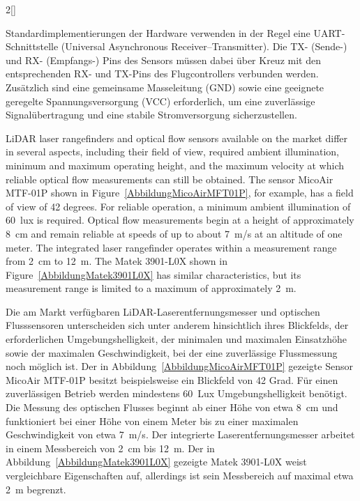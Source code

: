 \begin{paracol}{2}[]
\colger

Standardimplementierungen der Hardware verwenden in der Regel eine UART-Schnittstelle (Universal Asynchronous Receiver–Transmitter). Die TX- (Sende-) und RX- (Empfangs-) Pins des Sensors müssen dabei über Kreuz mit den entsprechenden RX- und TX-Pins des Flugcontrollers verbunden werden. Zusätzlich sind eine gemeinsame Masseleitung (GND) sowie eine geeignete geregelte Spannungsversorgung (VCC) erforderlich, um eine zuverlässige Signalübertragung und eine stabile Stromversorgung sicherzustellen.

\coleng

LiDAR laser rangefinders and optical flow sensors available on the market differ in several aspects, including their field of view, required ambient illumination, minimum and maximum operating height, and the maximum velocity at which reliable optical flow measurements can still be obtained. The sensor MicoAir MTF-01P shown in Figure~\ref{AbbildungMicoAirMFT01P}, for example, has a field of view of 42 degrees. For reliable operation, a minimum ambient illumination of 60~lux is required. Optical flow measurements begin at a height of approximately 8~cm and remain reliable at speeds of up to about 7~m/s at an altitude of one meter. The integrated laser rangefinder operates within a measurement range from 2~cm to 12~m. The Matek 3901-L0X shown in Figure~\ref{AbbildungMatek3901L0X} has similar characteristics, but its measurement range is limited to a maximum of approximately 2~m.

\colger

Die am Markt verfügbaren LiDAR-Laserentfernungsmesser und optischen Flusssensoren unterscheiden sich unter anderem hinsichtlich ihres Blickfelds, der erforderlichen Umgebungshelligkeit, der minimalen und maximalen Einsatzhöhe sowie der maximalen Geschwindigkeit, bei der eine zuverlässige Flussmessung noch möglich ist. Der in Abbildung~\ref{AbbildungMicoAirMFT01P} gezeigte Sensor MicoAir MTF-01P besitzt beispielsweise ein Blickfeld von 42 Grad. Für einen zuverlässigen Betrieb werden mindestens 60~Lux Umgebungshelligkeit benötigt. Die Messung des optischen Flusses beginnt ab einer Höhe von etwa 8~cm und funktioniert bei einer Höhe von einem Meter bis zu einer maximalen Geschwindigkeit von etwa 7~m/s. Der integrierte Laserentfernungsmesser arbeitet in einem Messbereich von 2~cm bis 12~m. Der in Abbildung~\ref{AbbildungMatek3901L0X} gezeigte Matek 3901-L0X weist vergleichbare Eigenschaften auf, allerdings ist sein Messbereich auf maximal etwa 2~m begrenzt.


\end{paracol}
